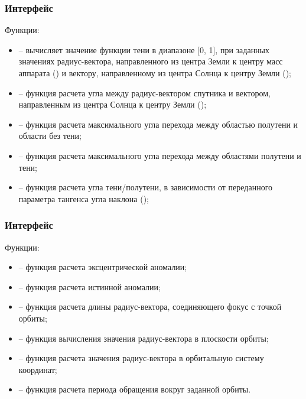 \subsubsection{Интерфейс }
\noindent\indent Функции:
\begin{itemize}
    \item {} -- вычисляет значение
    функции тени в диапазоне [0, 1], при заданных значениях радиус-вектора, направленного
    из центра Земли к центру масс аппарата () и вектору, направленному из центра Солнца
    к центру Земли ();
    \item {} -- функция расчета угла между радиус-вектором спутника
    и вектором, направленным из центра Солнца к центру Земли ();
    \item {} -- функция расчета максимального
    угла перехода между областью полутени и области без тени;
    \item {} -- функция расчета максимального
    угла перехода между областями полутени и тени;
    \item {} --
    функция расчета угла тени/полутени, в зависимости от переданного параметра
    тангенса угла наклона ();
\end{itemize}
\subsubsection{Интерфейс }
\noindent\indent Функции:
\begin{itemize}
    \item {} -- функция расчета эксцентрической аномалии;
    \item {} --
    функция расчета истинной аномалии;
    \item {} --
    функция расчета длины радиус-вектора, соединяющего фокус с точкой орбиты;
    \item {} -- функция вычисления значения радиус-вектора
    в плоскости орбиты;
    \item {} --
    функция расчета значения радиус-вектора в орбитальную систему координат;
    \item {} --
    функция расчета периода обращения вокруг заданной орбиты.
\end{itemize}
